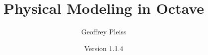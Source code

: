 \documentclass{book}
\newcommand{\thetitle}{Physical Modeling in Octave\myreg}
\newcommand{\theauthor}{Geoffrey Pleiss}
\newcommand{\theversion}{1.1.4}
\begin{document}
\title {\thetitle}
\author {\theauthor}
\date {Version \theversion}



% 






\tableofcontents


\mainmatter



% 

% 

% 

% 

% 

% 

% 

% 

% 

% 

% 

\end{document}
